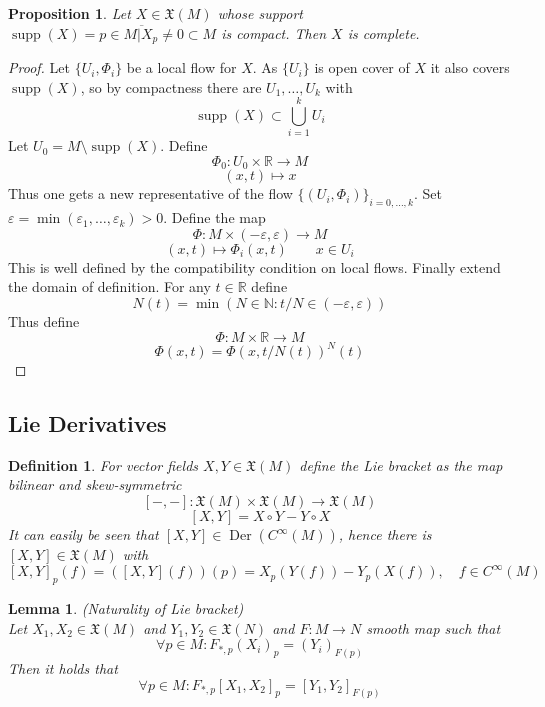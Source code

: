 \documentclass{article}
\numberwithin{theorem}{section}
\newtheorem{lemma}[theorem]{Lemma}
\newtheorem{proposition}[theorem]{Proposition}
\newtheorem{definition}[theorem]{Definition}
\newcommand{\N}{\mathbb{N}}
\newcommand{\R}{\mathbb{R}}
\newcommand{\1}{\mathds{1}}
\DeclareMathOperator{\Der}{Der}
\DeclareMathOperator{\supp}{supp}
\begin{document}
\begin{proposition}
    Let $X \in \mathfrak{X}(M)$ whose support $\supp(X)= \overline{p \in M | X_p \neq 0 } \subset M $ is compact. Then $X$ is complete. 
\end{proposition}
\begin{proof}
    Let $ \{ U_i, \Phi_i \}$ be a local flow for $X$. As $\{ U_i \}$ is open cover of $X$ it also covers $\supp(X)$, so by compactness there are $U_1 , \dots, U_k$ with 
    \[ \supp(X) \subset \bigcup_{i=1}^k U_i \]
    Let $U_0 = M \setminus \supp(X) $. Define 
    \[ \Phi_0 : U_0 \times \R \to M \] 
    \[ (x,t) \mapsto x \]
    Thus one gets a new representative of the flow $\{ (U_i, \Phi_i) \}_{i =0, \dots, k }$. Set $\varepsilon = \min(\varepsilon_1, \dots, \varepsilon_k ) > 0$. Define the map 
    \[ \Phi : M \times (-\varepsilon, \varepsilon) \to M \]
    \[ (x,t) \mapsto \Phi_i(x,t) \qquad x \in U_i \] 
    This is well defined by the compatibility condition on local flows. Finally extend the domain of definition. For any $t \in \R$ define 
    \[ N(t) = \min(N \in \N : t / N \in (-\varepsilon, \varepsilon)) \]
    Thus define 
    \[ \Phi : M \times \R \to M \]
    \[ \Phi(x,t) = \Phi(x, t/N(t))^N(t) \]

\end{proof}


\subsection{Lie Derivatives}

\begin{definition}
    For vector fields $X,Y \in \mathfrak{X}(M)$ define the Lie bracket  as the map bilinear and skew-symmetric 
    \[ [- , - ] : \mathfrak{X}(M) \times \mathfrak{X}(M) \to \mathfrak{X}(M) \]
    \[ [X, Y] = X \circ Y - Y \circ X \]
    It can easily be seen that $[ X,Y] \in \Der(C^\infty(M))$, hence there is $[X,Y] \in \mathfrak{X}(M)$ with 
    \[ [X,Y]_p(f) = ([X,Y](f))(p) =  X_p(Y(f)) - Y_p(X(f)), \quad f \in C^\infty(M) \]
\end{definition}

\begin{lemma}(Naturality of Lie bracket)\\
    Let $X_1, X_2 \in \mathfrak{X}(M)$ and $Y_1, Y_2 \in \mathfrak{X}(N)$ and $F: M \to N$ smooth map such that 
    \[ \forall p \in M : F_{*,p}(X_i)_p = (Y_i)_{F(p)}  \]
    Then it holds that 
    \[ \forall p \in M : F_{*,p}[X_1, X_2]_p = [Y_1, Y_2]_{F(p)} \]
\end{lemma}
\end{document}
